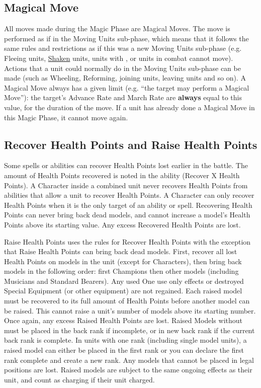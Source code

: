 \subsection{Magical Move}
\label{magical_move}

All moves made during the Magic Phase are Magical Moves. The move is performed as if in the Moving Units sub-phase, which means that it follows the same rules and restrictions as if this was a new Moving Units sub-phase (e.g. Fleeing units, \hyperref[shaken]{Shaken} units, units with \hyperref[random_movement]{\randommovement{}}, or units in combat cannot move). Actions that a unit could normally do in the Moving Units sub-phase can be made (such as Wheeling, Reforming, joining units, leaving units and so on). A Magical Move always has a given limit (e.g. \enquote{the target may perform a  Magical Move}): the target's Advance Rate and March Rate are \textbf{always} equal to this value, for the duration of the move. If a unit has already done a Magical Move in this Magic Phase, it cannot move again.

\subsection{Recover Health Points and Raise Health Points}
\label{recover_and_raise_health_points}

Some spells or abilities can recover Health Points lost earlier in the battle. The amount of Health Points recovered is noted in the ability (Recover X Health Points). A Character inside a combined unit never recovers Health Points from abilities that allow a unit to recover Health Points. A Character can only recover Health Points when it is the only target of an ability or spell. Recovering Health Points can never bring back dead models, and cannot increase a model's Health Points above its starting value. Any excess Recovered Health Points are lost.

Raise Health Points uses the rules for Recover Health Points with the exception that Raise Health Points can bring back dead models. First, recover all lost Health Points on models in the unit (except for Characters), then bring back models in the following order: first Champions then other \rnf{} models (including Musicians and Standard Bearers). Any used One use only effects or destroyed Special Equipment (or other equipment) are not regained. Each raised model must be recovered to its full amount of Health Points before another model can be raised. This cannot raise a unit's number of models above its starting number. Once again, any excess Raised Health Points are lost. Raised Models without \frontrank{} must be placed in the back rank if incomplete, or in  new back rank if the current back rank is complete. In units with one rank (including single model units), a raised model can either be placed in the first rank or you can declare the first rank complete and create a new rank. Any models that cannot be placed in legal positions are lost. Raised models are subject to the same ongoing effects as their unit, and count as charging if their unit charged.

